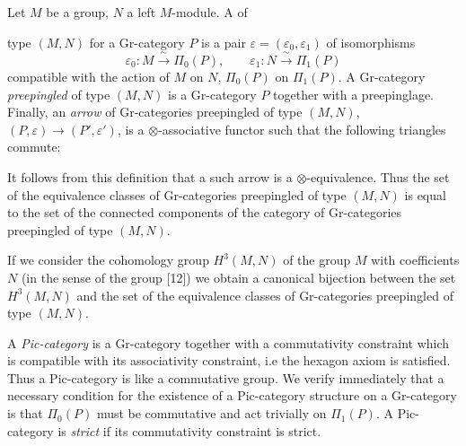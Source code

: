 \documentclass[11pt,a4paper]{article}
\begin{document}
Let $M$ be a group, $N$ a left $M$-module. A  of

type $(M,N)$ for a Gr-category $P$ is a pair $\varepsilon = (\varepsilon_{0},
\varepsilon_{1})$ of isomorphisms
\[
\varepsilon_{0} : M \xrightarrow{\ \sim\ } \Pi_{0}(P), \qquad
\varepsilon_{1} : N \xrightarrow{\ \sim\ } \Pi_{1}(P)
\]
compatible with the action of $M$ on $N$, $\Pi_{0}(P)$ on $\Pi_{1}(P)$. A
Gr-category \emph{preepingled} of type $(M,N)$ is a Gr-category $P$
together with a preepinglage. Finally, an \emph{arrow} of Gr-categories
preepingled of type $(M,N)$, $(P, \varepsilon) \to (P', \varepsilon')$, is
a $\otimes$-associative functor such that the following triangles
commute:



It follows from this definition that a such arrow is a
$\otimes$-equivalence. Thus the set of the equivalence classes of
Gr-categories preepingled of type $(M,N)$ is equal to the set of the
connected components of the category of Gr-categories preepingled of type
$(M,N)$.

If we consider the cohomology group $H^{3}(M,N)$ of the group $M$ with
coefficients $N$ (in the sense of the group  [12]) we
obtain a canonical bijection between the set $H^{3}(M,N)$ and the set of
the equivalence classes of Gr-categories preepingled of type $(M,N)$.

A \emph{Pic-category} is a Gr-category together with a commutativity
constraint which is compatible with its associativity constraint, i.e the
hexagon axiom is satisfied. Thus a Pic-category is like a commutative
group. We verify immediately that a necessary condition for the existence
of a Pic-category structure on a Gr-category is that $\Pi_{0}(P)$ must be
commutative and act trivially on $\Pi_{1}(P)$. A Pic-category is
\emph{strict} if its commutativity constraint is strict.
\end{document}
